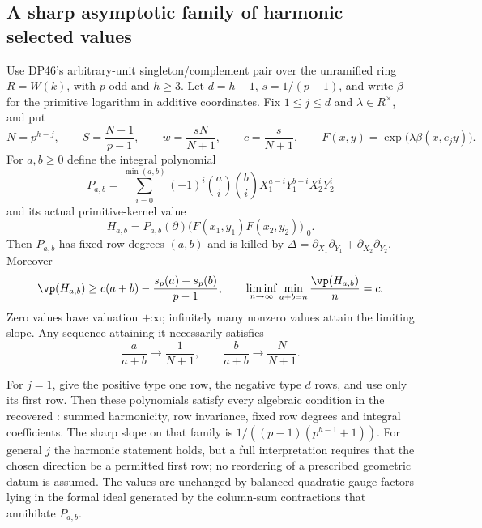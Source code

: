 \subsection{A sharp asymptotic family of harmonic selected values}

\begin{theorem}\label{DP51}
Use DP46's arbitrary-unit singleton/complement pair over the unramified ring
$R=W(k)$, with $p$ odd and $h\ge3$.
Let $d=h-1$, $s=1/(p-1)$, and write $\beta$ for the primitive logarithm in additive coordinates.
Fix $1\le j\le d$ and $\lambda\in R^\times$, and put
\[
 N=p^{h-j},\qquad S=\frac{N-1}{p-1},\qquad
 w=\frac{sN}{N+1},\qquad c=\frac{s}{N+1},
 \qquad F(x,y)=\exp\bigl(\lambda\beta(x,e_jy)\bigr).
\]
For $a,b\ge0$ define the integral polynomial
\[
 P_{a,b}=\sum_{i=0}^{\min(a,b)}(-1)^i
 \binom ai\binom bi
 X_1^{a-i}Y_1^{b-i}X_2^iY_2^i
\]
and its actual primitive-kernel value
\[
 H_{a,b}=P_{a,b}(\partial)
       \bigl(F(x_1,y_1)F(x_2,y_2)\bigr)\big|_0.
\]
Then $P_{a,b}$ has fixed row degrees $(a,b)$ and is killed by
$\Delta=\partial_{X_1}\partial_{Y_1}+\partial_{X_2}\partial_{Y_2}$.
Moreover
\begin{equation}\label{eq:harmonicsharp}
 \vp(H_{a,b})\ge c(a+b)-\frac{s_p(a)+s_p(b)}{p-1},
 \qquad
 \liminf_{n\to\infty}\min_{a+b=n}\frac{\vp(H_{a,b})}{n}=c.
\end{equation}
Zero values have valuation $+\infty$; infinitely many nonzero values attain the limiting slope.
Any sequence attaining it necessarily satisfies
\[
 \frac{a}{a+b}\longrightarrow\frac1{N+1},\qquad
 \frac{b}{a+b}\longrightarrow\frac{N}{N+1}.
\]

For $j=1$, give the positive type one row, the negative type $d$ rows, and use only its first row.
Then these polynomials satisfy every algebraic condition in the recovered : summed harmonicity, row invariance, fixed row degrees and integral coefficients.
The sharp slope on that family is $1/((p-1)(p^{h-1}+1))$.
For general $j$ the harmonic statement holds, but a full  interpretation requires that the chosen direction be a permitted first row; no reordering of a prescribed geometric datum is assumed.
The values are unchanged by balanced quadratic gauge factors lying in the formal ideal generated by the column-sum contractions that annihilate $P_{a,b}$.
\end{theorem}

